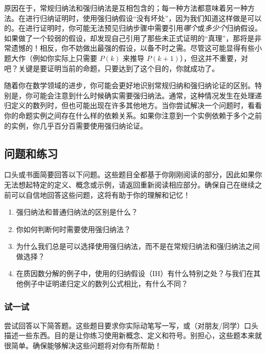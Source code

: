 原因在于，常规归纳法和强归纳法是互相包含的；每一种方法都意味着另一种方法。在进行归纳证明时，使用强归纳假设``没有坏处''，因为我们知道这样做是可以的。在进行证明时，你可能无法预见归纳步骤中需要引用\emph{哪个}或\emph{多少个}归纳假设。如果做了一个较弱的假设，却发现自己引用了那些未正式证明的``真理''，那将是非常遗憾的！相反，你不妨做出最强的假设，以备不时之需。尽管这可能显得有些小题大作（例如你实际上只需要 $P(k)$ 来推导 $P(k+1)$），但这并不重要，对吧？关键是要证明当前的命题，只要达到了这个目的，你就成功了。

随着你在数学领域的进步，你可能会更好地识别常规归纳和强归纳论证的区别。特别是，你可能会注意到什么时候确实需要强归纳法。通常，这种情况发生在处理递归定义的数列时，但也可能出现在许多其他地方。当你尝试解决一个问题时，看看你的命题实例之间存在什么样的依赖关系。如果你注意到一个实例依赖于多个之前的实例，你几乎百分百需要使用强归纳论证。

\subsection{问题和练习}

口头或书面简要回答以下问题。这些题目全都基于你刚刚阅读的部分，因此如果你无法想起特定的定义、概念或示例，请返回重新阅读相应部分。确保自己在继续之前可以自信地回答这些问题，这将有助于你的理解和记忆！

\begin{enumerate}[label=(\arabic*)]
    \item 强归纳法和普通归纳法的区别是什么？
    \item 你如何判断何时需要使用强归纳法？
    \item 为什么我们总是可以选择使用强归纳法，而不是在常规归纳法和强归纳法之间做选择？
    \item 在质因数分解的例子中，使用的归纳假设（IH）有什么特别之处？与我们在其他例子中证明递归定义的数列公式相比，有什么不同？
\end{enumerate}

\subsubsection*{试一试}

尝试回答以下简答题。这些题目要求你实际动笔写一写，或（对朋友/同学）口头描述一些东西。目的是让你练习使用新概念、定义和符号。别担心，这些题本来就很简单。确保能够解决这些问题将对你有所帮助！

